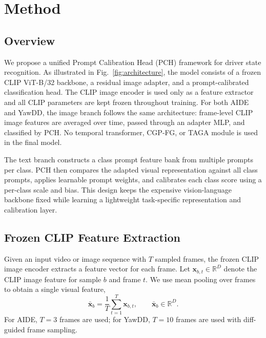 \section{Method}
\label{sec:method}

\subsection{Overview}
\label{sec:method_overview}

We propose a unified Prompt Calibration Head (PCH) framework for driver state recognition. As illustrated in Fig.~\ref{fig:architecture}, the model consists of a frozen CLIP ViT-B/32 backbone, a residual image adapter, and a prompt-calibrated classification head. The CLIP image encoder is used only as a feature extractor and all CLIP parameters are kept frozen throughout training. For both AIDE and YawDD, the image branch follows the same architecture: frame-level CLIP image features are averaged over time, passed through an adapter MLP, and classified by PCH. No temporal transformer, CGP-FG, or TAGA module is used in the final model.

The text branch constructs a class prompt feature bank from multiple prompts per class. PCH then compares the adapted visual representation against all class prompts, applies learnable prompt weights, and calibrates each class score using a per-class scale and bias. This design keeps the expensive vision-language backbone fixed while learning a lightweight task-specific representation and calibration layer.

\subsection{Frozen CLIP Feature Extraction}
\label{sec:frozen_clip_features}

Given an input video or image sequence with $T$ sampled frames, the frozen CLIP image encoder extracts a feature vector for each frame. Let $\mathbf{x}_{b,t} \in \mathbb{R}^{D}$ denote the CLIP image feature for sample $b$ and frame $t$. We use mean pooling over frames to obtain a single visual feature,
\begin{equation}
    \bar{\mathbf{x}}_{b} = \frac{1}{T}\sum_{t=1}^{T} \mathbf{x}_{b,t},
    \qquad \bar{\mathbf{x}}_{b} \in \mathbb{R}^{D}.
    \label{eq:frame_pooling}
\end{equation}
For AIDE, $T=3$ frames are used; for YawDD, $T=10$ frames are used with diff-guided frame sampling.

